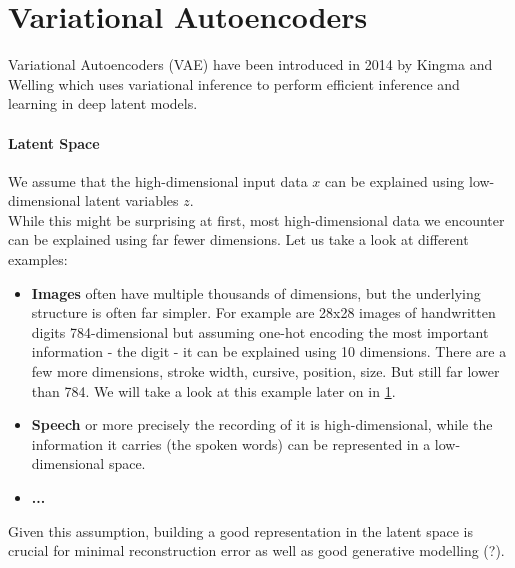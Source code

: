 \section{Variational Autoencoders}
\label{sec:vae}
Variational Autoencoders (VAE) have been introduced in 2014 by Kingma and Welling which uses variational inference to perform efficient inference and learning in deep latent models.

\paragraph{Latent Space}
We assume that the high-dimensional input data $x$ can be explained using low-dimensional latent variables $z$.\\
While this might be surprising at first, most high-dimensional data we encounter can be explained using far fewer dimensions.
Let us take a look at different examples:\\
\begin{itemize}
  \item \textbf{Images} often have multiple thousands of dimensions, but the underlying structure is often far simpler. For example are 28x28 images of handwritten digits 784-dimensional but assuming one-hot encoding the most important information - the digit - it can be explained using 10 dimensions. There are a few more dimensions, stroke width, cursive, position, size. But still far lower than 784. We will take a look at this example later on in \ref{sec:vae}.
  \item \textbf{Speech} or more precisely the recording of it is high-dimensional, while the information it carries (the spoken words) can be represented in a low-dimensional space.
  \item \textbf{...}
\end{itemize}

Given this assumption, building a good representation in the latent space is crucial for minimal reconstruction error as well as good generative modelling (?).
